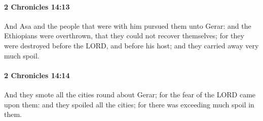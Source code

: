 		\paragraph{2 Chronicles 14:13} %
			\label{2CHRONICLES-14-13}

			And Asa and the people that were with him pursued them unto Gerar: and the Ethiopians were overthrown, that they could not recover themselves; for they were destroyed before the LORD, and before his host; and they carried away very much spoil.


		\paragraph{2 Chronicles 14:14} %
			\label{2CHRONICLES-14-14}

			And they smote all the cities round about Gerar; for the fear of the LORD came upon them: and they spoiled all the cities; for there was exceeding much spoil in them.

